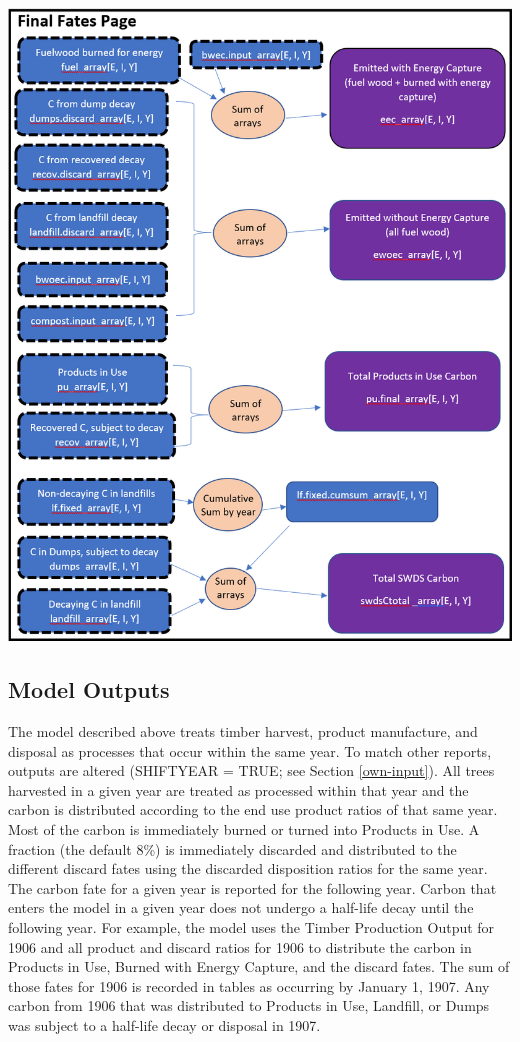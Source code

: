 \documentclass[
]{book}
\begin{document}
\newpage

\includegraphics[width=1\linewidth]{images/schematic-7}

\hypertarget{model-func-out}{%
\subsection{Model Outputs}\label{model-func-out}}

The model described above treats timber harvest, product manufacture, and disposal as processes that occur within the same year. To match other reports, outputs are altered (SHIFTYEAR = TRUE; see Section \ref{own-input}). All trees harvested in a given year are treated as processed within that year and the carbon is distributed according to the end use product ratios of that same year. Most of the carbon is immediately burned or turned into Products in Use. A fraction (the default 8\%) is immediately discarded and distributed to the different discard fates using the discarded disposition ratios for the same year. The carbon fate for a given year is reported for the following year. Carbon that enters the model in a given year does not undergo a half-life decay until the following year. For example, the model uses the Timber Production Output for 1906 and all product and discard ratios for 1906 to distribute the carbon in Products in Use, Burned with Energy Capture, and the discard fates. The sum of those fates for 1906 is recorded in tables as occurring by January 1, 1907. Any carbon from 1906 that was distributed to Products in Use, Landfill, or Dumps was subject to a half-life decay or disposal in 1907.
\end{document}
